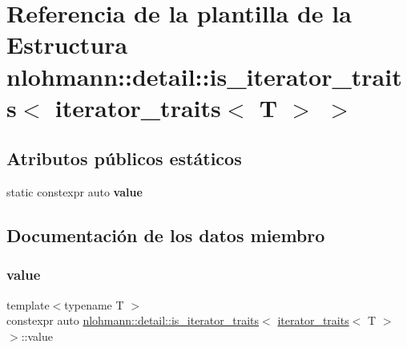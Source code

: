 \hypertarget{structnlohmann_1_1detail_1_1is__iterator__traits_3_01iterator__traits_3_01T_01_4_01_4}{}\section{Referencia de la plantilla de la Estructura nlohmann\+:\+:detail\+:\+:is\+\_\+iterator\+\_\+traits$<$ iterator\+\_\+traits$<$ T $>$ $>$}
\label{structnlohmann_1_1detail_1_1is__iterator__traits_3_01iterator__traits_3_01T_01_4_01_4}
\subsection*{Atributos públicos estáticos}
\begin{DoxyCompactItemize}
\item 
static constexpr auto {\bfseries value}
\end{DoxyCompactItemize}


\subsection{Documentación de los datos miembro}
\mbox{\label{structnlohmann_1_1detail_1_1is__iterator__traits_3_01iterator__traits_3_01T_01_4_01_4_ac2711760b352b8921accc6609957dc90}} 
\subsubsection{\texorpdfstring{value}{value}}
{\footnotesize\ttfamily template$<$typename T $>$ \\
constexpr auto \mbox{\hyperlink{structnlohmann_1_1detail_1_1is__iterator__traits}{nlohmann\+::detail\+::is\+\_\+iterator\+\_\+traits}}$<$ \mbox{\hyperlink{structnlohmann_1_1detail_1_1iterator__traits}{iterator\+\_\+traits}}$<$ T $>$ $>$\+::value\hspace{0.3cm}{\ttfamily [static]}}

